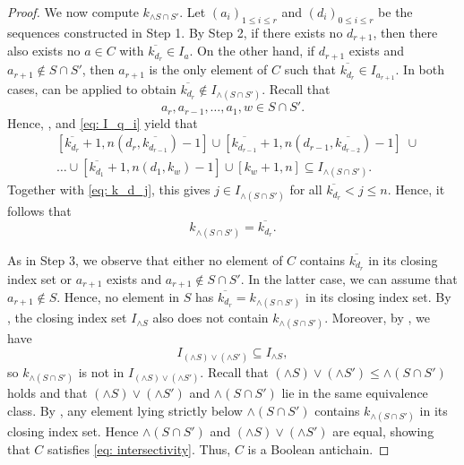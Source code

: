 \documentclass{preprint}
\theoremstyle{definition}
\begin{document}
\begin{proof}
     We now compute $k_{\wedge S\cap S'}$.
    Let $(a_i)_{1\leq i\leq r}$ and $(d_i)_{0 \leq i\leq r}$ be the sequences constructed in {\sf Step 1}. By {\sf Step 2}, if there exists no $d_{r+1}$, then there also exists no $a \in C$ with $\overline{k_{d_r}} \in I_a$. On the other hand, if $d_{r+1}$ exists and $a_{r+1}\notin S\cap S'$, then $a_{r+1}$ is the only element of $C$ such that $\overline{k_{d_r}} \in I_{a_{r+1}}$. In both cases,  can be applied to obtain $\overline{k_{d_r}} \notin I_{\wedge(S\cap S')}$. Recall that
    $$
    a_r,a_{r-1},\dots,a_1,w \in S\cap S'.
    $$
    Hence, ,  and \eqref{eq: I_q_i} yield that
    \begin{align*}
        &[\overline{k_{d_r}}+1,n(d_r,\overline{k_{d_{r-1}}})-1] \cup [\overline{k_{d_{r-1}}}+1,n(d_{r-1},\overline{k_{d_{r-2}}})-1]\; \cup \\ &\dots \cup [\overline{k_{d_1}}+1,n(d_1,k_w)-1] \cup 
    [k_w+1,n]\subseteq I_{\wedge(S\cap S')}.
    \end{align*}
    Together with \eqref{eq: k_d_j}, this gives $j \in I_{\wedge(S\cap S')}$ for all $\overline{k_{d_r}}<j\leq n$. Hence, it follows that 
    $$
        k_{\wedge (S \cap S')} = \overline{k_{d_r}}.
    $$
    
     As in {\sf Step 3}, we observe that either no element of $C$ contains $\overline{k_{d_{r}}}$ in its closing index set or $a_{r+1}$ exists and $a_{r+1}\notin S\cap S'$. In the latter case, we can assume that $a_{r+1} \notin S$. Hence, no element in $S$ has $\overline{k_{d_r}}=k_{\wedge (S \cap S')}$ in its closing index set. By , the closing index set $I_{\wedge S}$ also does not contain $k_{\wedge (S \cap S')}$. Moreover, by , we have 
    \[I_{(\wedge S)\vee (\wedge S')} \subseteq I_{\wedge S},\]
    so $k_{\wedge (S \cap S')}$ is not in $I_{(\wedge S)\vee (\wedge S')}$. Recall that $(\wedge S)\vee (\wedge S') \leq \wedge(S\cap S')$ holds and that $(\wedge S)\vee (\wedge S')$ and $ \wedge(S\cap S')$ lie in the same equivalence class. By , any element lying strictly below $\wedge (S\cap S')$ contains $k_{\wedge(S\cap S')}$ in its closing index set. Hence $\wedge (S\cap S')$ and $(\wedge S) \vee (\wedge S')$ are equal, showing that $C$ satisfies \eqref{eq: intersectivity}. Thus, $C$ is a Boolean antichain. 
\end{proof}
\end{document}
